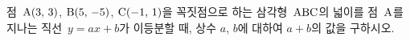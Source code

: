 점~$\mathrm{A}(3,\,3)$, $\mathrm{B}(5,\,-5)$, $\mathrm{C}(-1,\,1)$을 꼭짓점으로 하는 삼각형~$\mathrm{ABC}$의 넓이를 점~$\mathrm{A}$를 지나는 직선~$y=ax+b$가 이등분할 때, 상수 $a$, $b$에 대하여 $a+b$의 값을 구하시오.
